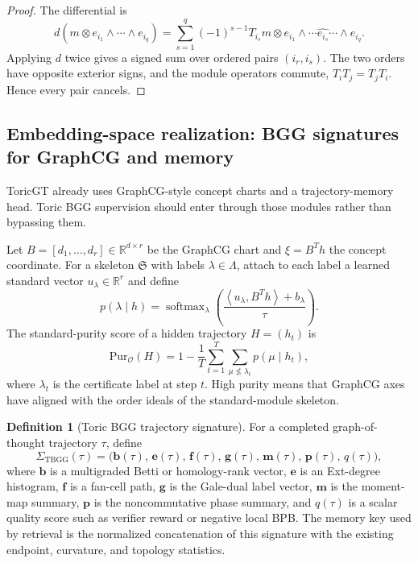 \documentclass[11pt]{article}
\theoremstyle{definition}
\newtheorem{definition}{Definition}[section]
\theoremstyle{plain}
\theoremstyle{remark}
\numberwithin{equation}{section}
\newcommand{\R}{\mathbb{R}}
\newcommand{\softmax}{\operatorname{softmax}}
\newcommand{\ip}[2]{\left\langle #1,#2\right\rangle}
\begin{document}
\begin{proof}
The differential is
\begin{equation}
  d(m\otimes e_{i_1}\wedge\cdots\wedge e_{i_q})=\sum_{s=1}^q(-1)^{s-1}T_{i_s}m\otimes e_{i_1}\wedge\cdots\widehat{e_{i_s}}\cdots\wedge e_{i_q}.
\end{equation}
Applying $d$ twice gives a signed sum over ordered pairs $(i_r,i_s)$.  The two orders have opposite exterior signs, and the module operators commute, $T_iT_j=T_jT_i$.  Hence every pair cancels.
\end{proof}

\subsection{Embedding-space realization: BGG signatures for GraphCG and memory}

ToricGT already uses GraphCG-style concept charts and a trajectory-memory head.  Toric BGG supervision should enter through those modules rather than bypassing them.

Let $B=[d_1,\ldots,d_r]\in\R^{d\times r}$ be the GraphCG chart and $\xi=B^Th$ the concept coordinate.  For a skeleton $\mathfrak S$ with labels $\lambda\in\Lambda$, attach to each label a learned standard vector $u_\lambda\in\R^r$ and define
\begin{equation}
  p(\lambda\mid h)=\softmax_\lambda\left(\frac{\ip{u_\lambda}{B^Th}+b_\lambda}{\tau}\right).
\end{equation}
The standard-purity score of a hidden trajectory $H=(h_t)$ is
\begin{equation}
  \mathrm{Pur}_{\mathcal O}(H)=1-\frac{1}{T}\sum_{t=1}^T\sum_{\mu\not\leq \lambda_t}p(\mu\mid h_t),
\end{equation}
where $\lambda_t$ is the certificate label at step $t$.  High purity means that GraphCG axes have aligned with the order ideals of the standard-module skeleton.

\begin{definition}[Toric BGG trajectory signature]\label{def:bgg-signature}
For a completed graph-of-thought trajectory $\tau$, define
\begin{equation}
  \Sigma_{\mathrm{TBGG}}(\tau)=\bigl(\mathbf b(\tau),\,\mathbf e(\tau),\,\mathbf f(\tau),\,\mathbf g(\tau),\,\mathbf m(\tau),\,\mathbf p(\tau),\,q(\tau)\bigr),
\end{equation}
where $\mathbf b$ is a multigraded Betti or homology-rank vector, $\mathbf e$ is an Ext-degree histogram, $\mathbf f$ is a fan-cell path, $\mathbf g$ is the Gale-dual label vector, $\mathbf m$ is the moment-map summary, $\mathbf p$ is the noncommutative phase summary, and $q(\tau)$ is a scalar quality score such as verifier reward or negative local BPB.  The memory key used by retrieval is the normalized concatenation of this signature with the existing endpoint, curvature, and topology statistics.
\end{definition}
\end{document}
